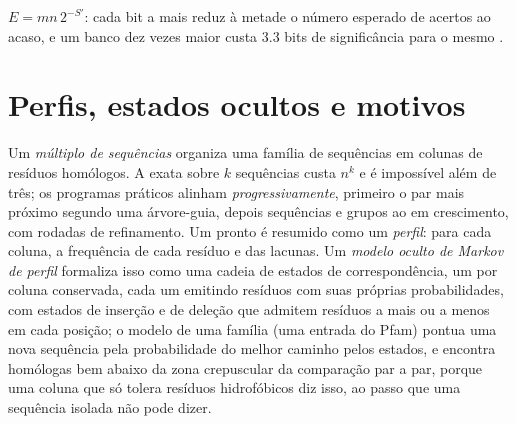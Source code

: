 \begin{omfigure}

{\small $E = mn\,2^{-S'}$: cada bit a mais reduz à metade o número
esperado de acertos ao acaso, e um banco dez vezes maior custa $3.3$
bits de significância para o mesmo .}
\end{omfigure}

\section{Perfis, estados ocultos e motivos}

\begin{definition}\label{def:b3:bioinformatics:msa}
Um \emph{ múltiplo de sequências} organiza uma família de
sequências em colunas de resíduos homólogos. A 
exata sobre $k$ sequências custa $n^{k}$ e é impossível além de três;
os programas práticos alinham \emph{progressivamente}, primeiro o par
mais próximo segundo uma árvore-guia, depois sequências e grupos ao
 em crescimento, com rodadas de refinamento. Um 
pronto é resumido como um \emph{perfil}: para cada coluna, a frequência
de cada resíduo e das lacunas. Um \emph{modelo oculto de Markov de
perfil} formaliza isso como uma cadeia de estados de correspondência,
um por coluna conservada, cada um emitindo resíduos com suas próprias
probabilidades, com estados de inserção e de deleção que admitem
resíduos a mais ou a menos em cada posição; o modelo de uma família
(uma entrada do Pfam) pontua uma nova sequência pela probabilidade do
melhor caminho pelos estados, e encontra homólogas bem abaixo da zona
crepuscular da comparação par a par, porque uma coluna que só tolera
resíduos hidrofóbicos diz isso, ao passo que uma sequência isolada não
pode dizer.
\end{definition}

